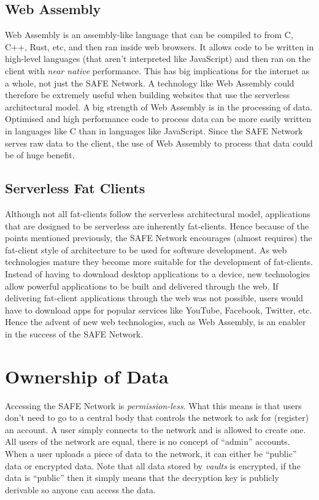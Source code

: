 \subsection{Web Assembly}

Web Assembly is an assembly-like language that can be compiled to from C, C++, Rust, etc, and then ran inside web browsers. It allows code to be written in high-level languages (that aren't interpreted like JavaScript) and then ran on the client with \textit{near native} performance. This has big implications for the internet as a whole, not just the SAFE Network. A technology like Web Assembly could therefore be extremely useful when building websites that use the serverless architectural model. A big strength of Web Assembly is in the processing of data. Optimised and high performance code to process data can be more easily written in languages like C than in languages like JavaScript. Since the SAFE Network serves raw data to the client, the use of Web Assembly to process that data could be of huge benefit.

\subsection{Serverless Fat Clients}

Although not all fat-clients follow the serverless architectural model, applications that are designed to be serverless are inherently fat-clients. Hence because of the points mentioned previously, the SAFE Network encourages (almost requires) the fat-client style of architecture to be used for software development. As web technologies mature they become more suitable for the development of fat-clients. Instead of having to download desktop applications to a device, new technologies allow powerful applications to be built and delivered through the web. If delivering fat-client applications through the web was not possible, users would have to download apps for popular services like YouTube, Facebook, Twitter, etc. Hence the advent of new web technologies, such as Web Assembly, is an enabler in the success of the SAFE Network.

\section{Ownership of Data}
\label{sec:ownership-of-data}

Accessing the SAFE Network is \textit{permission-less}. What this means is that users don't need to go to a central body that controls the network to ask for (register) an account. A user simply connects to the network and is allowed to create one. All users of the network are equal, there is no concept of ``admin'' accounts. When a user uploads a piece of data to the network, it can either be ``public'' data or encrypted data. Note that all data stored by \textit{vaults} is encrypted, if the data is ``public'' then it simply means that the decryption key is publicly derivable so anyone can access the data.

